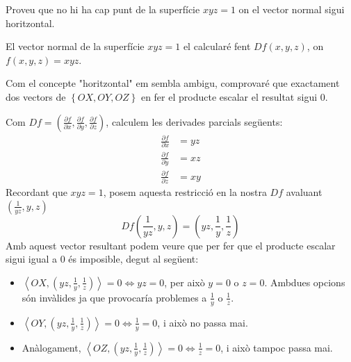 \documentclass[a4paper, 12pt]{article}
\begin{document}
    \setcounter{numex}{32}
    \begin{exercici}
        Proveu que no hi ha cap punt de la superfície $xyz = 1$ on el vector normal sigui horitzontal.
    \end{exercici}
    \begin{solucio}
        El vector normal de la superfície $xyz = 1$ el calcularé fent $Df(x,y,z)$, on $f(x,y,z) = xyz$.
        \begin{obs}
            Com el concepte "horitzontal" em sembla ambigu, comprovaré que exactament dos vectors de $\left\{OX, OY, OZ\right\}$
            en fer el producte escalar el resultat sigui $0$.
        \end{obs}
        Com $Df = \left(\frac{\partial f}{\partial x}, \frac{\partial f}{\partial y}, \frac{\partial f}{\partial z}\right)$,
        calculem les derivades parcials següents:
        \begin{displaymath}
            \begin{split}
                \frac{\partial f}{\partial x} &= yz\\
                \frac{\partial f}{\partial y} &= xz\\
                \frac{\partial f}{\partial z} &= xy
            \end{split}
        \end{displaymath}
        Recordant que $xyz = 1$, posem aquesta restricció en la nostra $Df$ avaluant $\left(\frac{1}{yz}, y, z\right)$
        \begin{displaymath}
            Df\left(\frac{1}{yz}, y, z\right) = \left(yz, \frac{1}{y}, \frac{1}{z}\right)  
        \end{displaymath}
        Amb aquest vector resultant podem veure que per fer que el producte escalar sigui igual a $0$
        és imposible, degut al següent:
        \begin{itemize}
            \item $\left\langle OX, \left(yz, \frac{1}{y}, \frac{1}{z}\right)\right\rangle = 0 \iff yz = 0$,
            per això $y = 0$ o $z = 0$. Ambdues opcions són invàlides ja que provocaría problemes a
            $\frac{1}{y}$ o $\frac{1}{z}$.
            \item $\left\langle OY, \left(yz, \frac{1}{y}, \frac{1}{z}\right)\right\rangle = 0 \iff \frac{1}{y} = 0$,
            i això no passa mai.
            \item Anàlogament, $\left\langle OZ, \left(yz, \frac{1}{y}, \frac{1}{z}\right)\right\rangle = 0 \iff \frac{1}{z} = 0$,
            i això tampoc passa mai.
        \end{itemize}
    \end{solucio}
\end{document}
